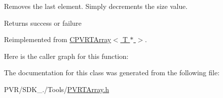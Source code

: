 Removes the last element. Simply decrements the size value. 



 \begin{DoxyReturn}{Returns}
success or failure 
\end{DoxyReturn}


Reimplemented from \hyperlink{class_c_p_v_r_t_array_ad804568ace15ce5c5bac5bd331ffab95}{C\+P\+V\+R\+T\+Array$<$ T $\ast$ $>$}.



Here is the caller graph for this function\+:




The documentation for this class was generated from the following file\+:\begin{DoxyCompactItemize}
\item 
P\+V\+R/\+S\+D\+K\+\_./\+Tools/\hyperlink{_p_v_r_t_array_8h}{P\+V\+R\+T\+Array.\+h}\end{DoxyCompactItemize}
